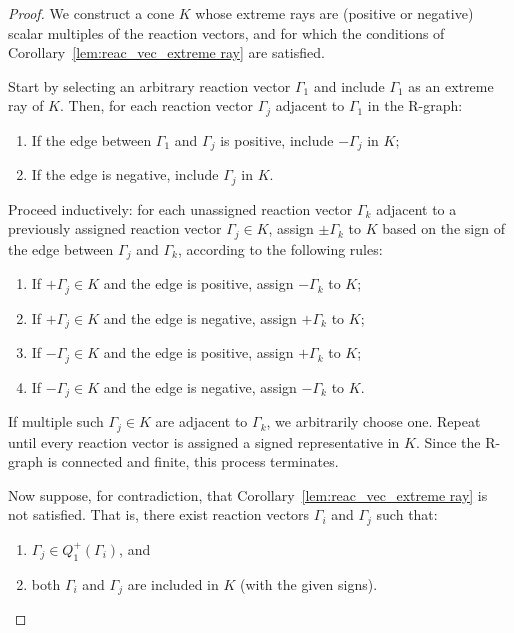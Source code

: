 \documentclass{article}
\begin{document}
\begin{proof}
We construct a cone \( K \) whose extreme rays are (positive or negative) scalar multiples of the reaction vectors, and for which the conditions of Corollary~\ref{lem:reac_vec_extreme ray} are satisfied.

Start by selecting an arbitrary reaction vector \( \Gamma_1 \) and include \( \Gamma_1 \) as an extreme ray of \( K \). Then, for each reaction vector \( \Gamma_j \) adjacent to \( \Gamma_1 \) in the R-graph:
\begin{enumerate}
    \item If the edge between \( \Gamma_1 \) and \( \Gamma_j \) is positive, include \( -\Gamma_j \) in \( K \);
    \item If the edge is negative, include \( \Gamma_j \) in \( K \).
\end{enumerate}

Proceed inductively: for each unassigned reaction vector \( \Gamma_k \) adjacent to a previously assigned reaction vector \( \Gamma_j \in K \), assign \( \pm \Gamma_k \) to \( K \) based on the sign of the edge between \( \Gamma_j \) and \( \Gamma_k \), according to the following rules:
\begin{enumerate}
    \item If \( +\Gamma_j \in K \) and the edge is positive, assign \( -\Gamma_k \) to \( K \);
    \item If \( +\Gamma_j \in K \) and the edge is negative, assign \( +\Gamma_k \) to \( K \);
    \item If \( -\Gamma_j \in K \) and the edge is positive, assign \( +\Gamma_k \) to \( K \);
    \item If \( -\Gamma_j \in K \) and the edge is negative, assign \( -\Gamma_k \) to \( K \).
\end{enumerate}
If multiple such \( \Gamma_j \in K \) are adjacent to \( \Gamma_k \), we arbitrarily choose one. Repeat until every reaction vector is assigned a signed representative in \( K \). Since the R-graph is connected and finite, this process terminates.

Now suppose, for contradiction, that Corollary~\ref{lem:reac_vec_extreme ray} is not satisfied. That is, there exist reaction vectors \( \Gamma_i \) and \( \Gamma_j \) such that:
\begin{enumerate}
    \item \( \Gamma_j \in Q_1^+(\Gamma_i) \), and
    \item both \( \Gamma_i \) and \( \Gamma_j \) are included in \( K \) (with the given signs).
\end{enumerate}


\end{proof}
\end{document}
